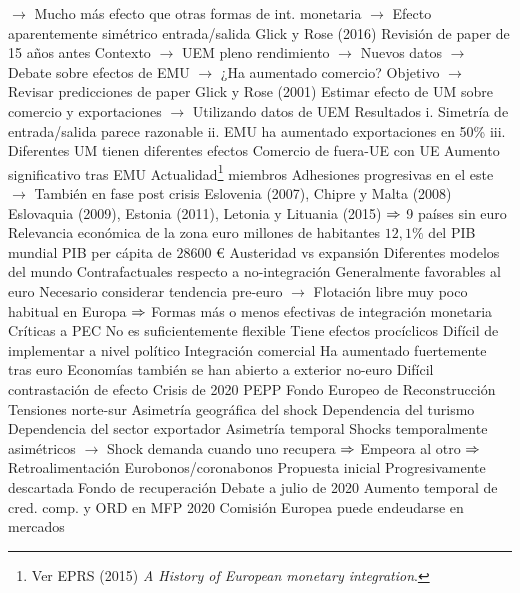 \documentclass{nuevotema}
\begin{document}
\begin{esquemal}
				\4[] $\to$ Mucho más efecto que otras formas de int. monetaria
				\4[] $\to$ Efecto aparentemente simétrico entrada/salida
				\4 Glick y Rose (2016)
				\4[] Revisión de paper de 15 años antes
				\4[] Contexto
				\4[] $\to$ UEM pleno rendimiento
				\4[] $\to$ Nuevos datos
				\4[] $\to$ Debate sobre efectos de EMU
				\4[] $\to$ ¿Ha aumentado comercio?
				\4[] Objetivo
				\4[]$\to$  Revisar predicciones de paper Glick y Rose (2001)
				\4[] Estimar efecto de UM sobre comercio y exportaciones
				\4[] $\to$ Utilizando datos de UEM
				\4[] Resultados
				\4[] i. Simetría de entrada/salida parece razonable
				\4[] ii. EMU ha aumentado exportaciones en 50\%
				\4[] iii. Diferentes UM tienen diferentes efectos
				\4 Comercio de fuera-UE con UE
				\4[] Aumento significativo tras EMU
			\3 Actualidad\footnote{Ver EPRS (2015) \textit{A History of European monetary integration}.}
				 miembros
				\4[] Adhesiones progresivas en el este
				\4[] $\to$ También en fase post crisis
				\4[] Eslovenia (2007), Chipre y Malta (2008)
				\4[] Eslovaquia (2009), Estonia (2011),
				\4[] Letonia y Lituania (2015)
				\4[] $\Rightarrow$ 9 países sin euro
				\4 Relevancia económica de la zona euro
				 millones de habitantes
				\4[] $12,1\%$ del PIB mundial
				\4[] PIB per cápita de $28600$ €
				\4 Austeridad vs expansión
				\4[] Diferentes modelos del mundo
				\4 Contrafactuales respecto a no-integración
				\4[] Generalmente favorables al euro
				\4[] Necesario considerar tendencia pre-euro
				\4[] $\to$ Flotación libre muy poco habitual en Europa
				\4[] $\Rightarrow$ Formas más o menos efectivas de integración monetaria
				\4 Críticas a PEC
				\4[] No es suficientemente flexible
				\4[] Tiene efectos procíclicos
				\4[] Difícil de implementar a nivel político
				\4 Integración comercial
				\4[] Ha aumentado fuertemente tras euro
				\4[] Economías también se han abierto a exterior no-euro
				\4[] Difícil contrastación de efecto
			\3 Crisis de 2020
				\4 PEPP
				\4 Fondo Europeo de Reconstrucción
				\4 Tensiones norte-sur
				\4 Asimetría geográfica del shock
				\4[] Dependencia del turismo
				\4[] Dependencia del sector exportador
				\4 Asimetría temporal
				\4[] Shocks temporalmente asimétricos
				\4[] $\to$ Shock demanda cuando uno recupera
				\4[] $\Rightarrow$ Empeora al otro
				\4[] $\Rightarrow$ Retroalimentación
				\4 Eurobonos/coronabonos
				\4[] Propuesta inicial
				\4[] Progresivamente descartada
				\4 Fondo de recuperación
				\4[] Debate a julio de 2020
				\4[] Aumento temporal de cred. comp. y ORD en MFP 2020
				\4[] Comisión Europea puede endeudarse en mercados

\end{esquemal}
\end{document}

